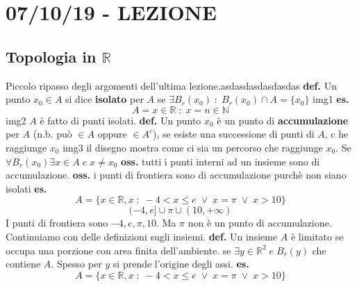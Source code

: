 \section*{07/10/19 - LEZIONE}
\subsection*{Topologia in $\mathbb{R}$}
Piccolo ripasso degli argomenti dell'ultima lezione.asdasdasdasdasdas
\newline
\textbf{def.} Un punto $x_0 \in A$ si dice \textbf{isolato} per $A$ se $\exists B_r(x_0) \;:\; B_r(x_0) \cap A = \{x_0\}$
\newline
img1
\newline
\textbf{es.} 
\[
    A = {x \in \mathbb{R} \;:\; x = n \in \mathbb{N}}
\]
img2
\newline
$A$ è fatto di punti isolati.
\newline
\textbf{def.} Un punto $x_0$ è un punto di \textbf{accumulazione} per $A$ (n.b. può $\in A$ oppure $\in A^c$), se esiste una successione di punti di $A$, c he raggiunge $x_0$
\newline
img3
\newline
il disegno mostra come ci sia un percorso che raggiunge $x_0$.
\newline
Se $\forall B_r(x_0) \exists x \in A \; e \; x \neq x_0$
\newline
\textbf{oss.} tutti i punti interni ad un insieme sono di accumulazione.
\newline
\textbf{oss.} i punti di frontiera sono di accumulazione purchè non siano isolati
\newline
\textbf{es.} 
\[
    A = \{x \in \mathbb{R}, x \;:\; -4 < x \leq e \;\lor\; x = \pi \;\lor\; x > 10\}
\]
\[
    (-4,e] \cup {\pi} \cup (10, +\infty)
\]
I punti di frontiera sono $-4, e, \pi, 10$. Ma $\pi$ non è un punto di accumulazione.
\newline
\newline
\newline
Continuiamo con delle definizioni sugli insiemi.
\newline
\newline
\textbf{def.} Un insieme $A$ è limitato se occupa una porzione con area finita dell'ambiente.
\newline
se $\exists y \in \mathbb{R}^2 \;e\; B_r(y)$ che contiene $A$. Spesso per $y$ si prende l'origine degli assi.
\newline
\textbf{es.} 
\[
    A = \{x \in \mathbb{R}, x \;:\; -4 < x \leq e \;\lor\; x = \pi \;\lor\; x > 10\}
\]
